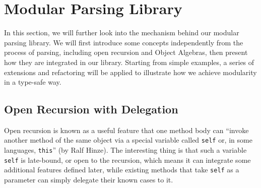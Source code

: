 \section{Modular Parsing Library}\label{sec:library}


In this section, we will further look into the mechanism behind our modular parsing library.
We will first introduce some concepts independently from the process of parsing, including open recursion and Object Algebras,
then present how they are integrated in our library.
Starting from simple examples, a series of extensions and refactoring will be applied to illustrate
how we achieve modularity in a type-safe way.

\subsection{Open Recursion with Delegation}\label{subsec:openrecursion}

Open recursion is known as a useful feature that one method body can ``invoke another method of the same object via a special variable called \lstinline{self} or, in some languages, \lstinline[keywords={}]{this}'' (by Ralf Hinze). The interesting thing is that such a variable \lstinline{self} is late-bound, or open to the recursion, which means it can integrate some additional features defined later, while existing methods that take \lstinline{self} as a parameter can simply delegate their known cases to it.


